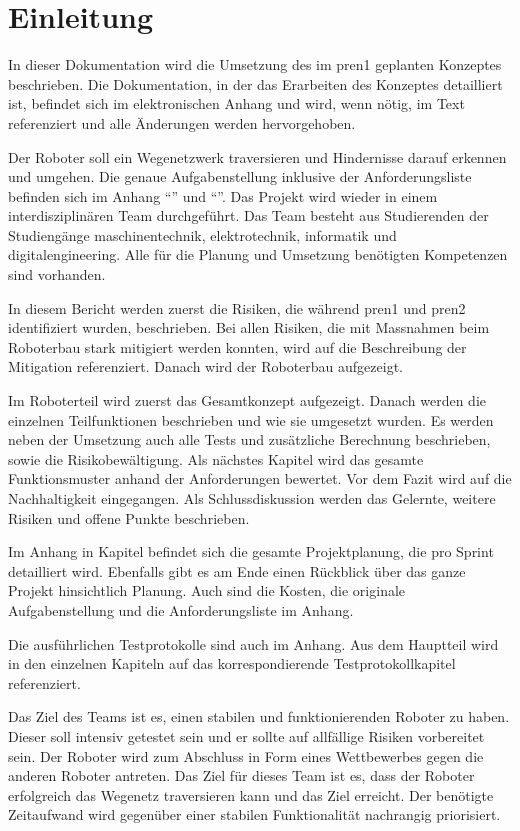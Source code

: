 \section{Einleitung}

In dieser Dokumentation wird die Umsetzung des im \acrfull{pren1} geplanten Konzeptes beschrieben. 
Die Dokumentation, in der das Erarbeiten des Konzeptes detailliert ist, befindet sich im elektronischen Anhang und wird, wenn nötig, im Text referenziert und alle Änderungen werden hervorgehoben.

Der Roboter soll ein Wegenetzwerk traversieren und Hindernisse darauf erkennen und umgehen. Die genaue Aufgabenstellung inklusive der Anforderungsliste befinden sich im Anhang ``'' und ``''. Das Projekt wird wieder in einem interdisziplinären Team durchgeführt. Das Team besteht aus Studierenden der Studiengänge \acrfull{maschinentechnik}, \acrfull{elektrotechnik}, \acrfull{informatik} und \acrfull{digitalengineering}. Alle für die Planung und Umsetzung benötigten Kompetenzen sind vorhanden.


In diesem Bericht werden zuerst die Risiken, die während \acrshort{pren1} und \acrshort{pren2} identifiziert wurden, beschrieben. Bei allen Risiken, die mit Massnahmen beim Roboterbau stark mitigiert werden konnten, wird auf die Beschreibung der Mitigation referenziert. Danach wird der Roboterbau aufgezeigt.

Im Roboterteil wird zuerst das Gesamtkonzept aufgezeigt. Danach werden die einzelnen Teilfunktionen beschrieben und wie sie umgesetzt wurden. Es werden neben der Umsetzung auch alle Tests und zusätzliche Berechnung beschrieben, sowie die Risikobewältigung. 
Als nächstes Kapitel wird das gesamte Funktionsmuster anhand der Anforderungen bewertet. Vor dem Fazit wird auf die Nachhaltigkeit eingegangen. Als Schlussdiskussion werden das Gelernte, weitere Risiken und offene Punkte beschrieben.

Im Anhang in Kapitel  befindet sich die gesamte Projektplanung, die pro Sprint detailliert wird. Ebenfalls gibt es am Ende einen Rückblick über das ganze Projekt hinsichtlich Planung. Auch sind die Kosten, die originale Aufgabenstellung und die Anforderungsliste im Anhang.

Die ausführlichen Testprotokolle sind auch im Anhang. Aus dem Hauptteil wird in den einzelnen Kapiteln auf das korrespondierende Testprotokollkapitel referenziert.


Das Ziel des Teams ist es, einen stabilen und funktionierenden Roboter zu haben. Dieser soll intensiv getestet sein und er sollte auf allfällige Risiken vorbereitet sein. Der Roboter wird zum Abschluss in Form eines Wettbewerbes gegen die anderen Roboter antreten. Das Ziel für dieses Team ist es, dass der Roboter erfolgreich das Wegenetz traversieren kann und das Ziel erreicht. Der benötigte Zeitaufwand wird gegenüber einer stabilen Funktionalität nachrangig priorisiert.
